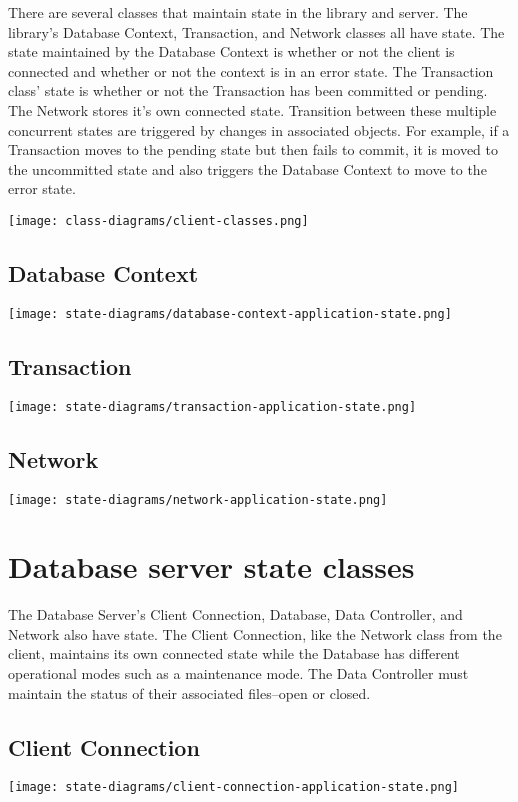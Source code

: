 \documentclass[a4paper]{report}
\begin{document}
	There are several classes that maintain state in the library and server. The library’s Database Context, Transaction, and Network classes all have state. The state maintained by the Database Context is whether or not the client is connected and whether or not the context is in an error state. The Transaction class’ state is whether or not the Transaction has been committed or pending. The Network stores it’s own connected state. Transition between these multiple concurrent states are triggered by changes in associated objects. For example, if a Transaction moves to the pending state but then fails to commit, it is moved to the uncommitted state and also triggers the Database Context to move to the error state.

	\texttt{[image: class-diagrams/client-classes.png]}

	\subsection{Database Context}
		\texttt{[image: state-diagrams/database-context-application-state.png]}
	\subsection{Transaction}
		\texttt{[image: state-diagrams/transaction-application-state.png]}
	\subsection{Network}
		\texttt{[image: state-diagrams/network-application-state.png]}

\section{Database server state classes}

	The Database Server’s Client Connection, Database, Data Controller, and Network also have state. The Client Connection, like the Network class from the client, maintains its own connected state while the Database has different operational modes such as a maintenance mode. The Data Controller must maintain the status of their associated files--open or closed.

	\subsection{Client Connection}
		\texttt{[image: state-diagrams/client-connection-application-state.png]}
\end{document}
